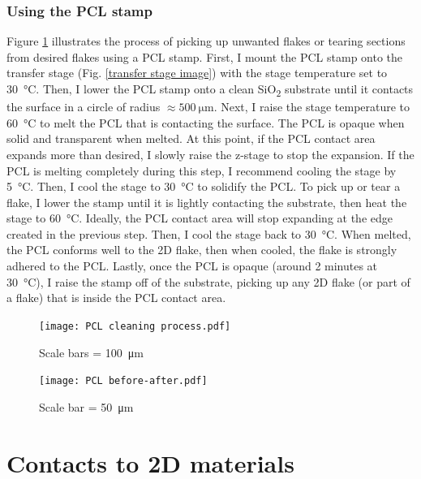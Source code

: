 \documentclass[double,12pt,1in]{beavtex}
\begin{document}
\subsubsection{Using the PCL stamp}
Figure \ref{PCL cleaning process} illustrates the process of picking up unwanted flakes or tearing sections from desired flakes using a PCL stamp. First, I mount the PCL stamp onto the transfer stage (Fig. \ref{transfer stage image}) with the stage temperature set to \SI{30}{\celsius}. Then, I lower the PCL stamp onto a clean SiO\textsubscript{2} substrate until it contacts the surface in a circle of radius $\approx \SI{500}{\micro\meter}$. Next, I raise the stage temperature to \SI{60}{\celsius} to melt the PCL that is contacting the surface. The PCL is opaque when solid and transparent when melted. At this point, if the PCL contact area expands more than desired, I slowly raise the z-stage to stop the expansion. If the PCL is melting completely during this step, I recommend cooling the stage by \SI{5}{\celsius}. Then, I cool the stage to \SI{30}{\celsius} to solidify the PCL. To pick up or tear a flake, I lower the stamp until it is lightly contacting the substrate, then heat the stage to \SI{60}{\celsius}. Ideally, the PCL contact area will stop expanding at the edge created in the previous step. Then, I cool the stage back to \SI{30}{\celsius}. When melted, the PCL conforms well to the 2D flake, then when cooled, the flake is strongly adhered to the PCL. Lastly, once the PCL is opaque (around 2 minutes at \SI{30}{\celsius}), I raise the stamp off of the substrate, picking up any 2D flake (or part of a flake) that is inside the PCL contact area.

\begin{figure}
    \texttt{[image: PCL cleaning process.pdf]}
    \caption{Scale bars = \SI{100}{\micro\meter}}
    \label{PCL cleaning process}
\end{figure}

\begin{figure}
    \texttt{[image: PCL before-after.pdf]}
    \caption{Scale bar = \SI{50}{\micro\meter}}
\end{figure}





\section{Contacts to 2D materials} \label{contacts to 2D materials}
\end{document}
